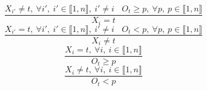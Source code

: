 $$\frac{X_{i'} \neq t,~\forall i',~i' \in \llbracket1,n\rrbracket,~i' \neq i~~~~O_{t} \geq p,~\forall p,~p \in \llbracket1,n\rrbracket}{X_{i}=t}$$ $$\frac{X_{i'}=t,~\forall i',~i' \in \llbracket1,n\rrbracket,~i' \neq i~~~~O_{t}<p,~\forall p,~p \in \llbracket1,n\rrbracket}{X_{i} \neq t}$$ $$\frac{X_{i}=t,~\forall i,~i \in \llbracket1,n\rrbracket}{O_{t} \geq p}$$ $$\frac{X_{i} \neq t,~\forall i,~i \in \llbracket1,n\rrbracket}{O_{t}<p}$$ 